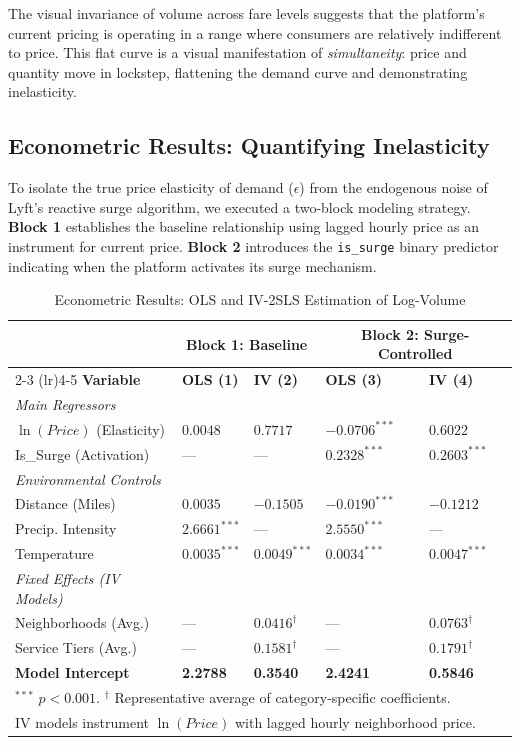 \documentclass[11pt, letterpaper]{article}
\begin{document}
The visual invariance of volume across fare levels suggests that the platform’s current pricing is operating in a range where consumers are relatively indifferent to price. This flat curve is a visual manifestation of \textit{simultaneity}: price and quantity move in lockstep, flattening the demand curve and demonstrating inelasticity.

\subsection{Econometric Results: Quantifying Inelasticity}

To isolate the true price elasticity of demand ($\epsilon$) from the endogenous noise of Lyft’s reactive surge algorithm, we executed a two-block modeling strategy. \textbf{Block 1} establishes the baseline relationship using lagged hourly price as an instrument for current price. \textbf{Block 2} introduces the \texttt{is\_surge} binary predictor indicating when the platform activates its surge mechanism.

\begin{table}[H]
\centering
\small
\caption{Econometric Results: OLS and IV-2SLS Estimation of Log-Volume}
\label{tab:elasticity_results}
\begin{tabularx}{\textwidth}{l p{1.8cm} p{1.8cm} p{1.8cm} p{1.8cm}}
\toprule
& \multicolumn{2}{c}{\textbf{Block 1: Baseline}} & \multicolumn{2}{c}{\textbf{Block 2: Surge-Controlled}} \\
\cmidrule(lr){2-3} \cmidrule(lr){4-5}
\textbf{Variable} & \textbf{OLS (1)} & \textbf{IV (2)} & \textbf{OLS (3)} & \textbf{IV (4)} \\
\midrule
\textit{Main Regressors} & & & & \\
$\ln(Price)$ (Elasticity) & $0.0048$ & $0.7717$ & $-0.0706^{***}$ & $0.6022$ \\
Is\_Surge (Activation) & --- & --- & $0.2328^{***}$ & $0.2603^{***}$ \\
\addlinespace
\textit{Environmental Controls} & & & & \\
Distance (Miles) & $0.0035$ & $-0.1505$ & $-0.0190^{***}$ & $-0.1212$ \\
Precip. Intensity & $2.6661^{***}$ & --- & $2.5550^{***}$ & --- \\
Temperature & $0.0035^{***}$ & $0.0049^{***}$ & $0.0034^{***}$ & $0.0047^{***}$ \\
\addlinespace
\textit{Fixed Effects (IV Models)} & & & & \\
Neighborhoods (Avg.) & --- & $0.0416^{\dagger}$ & --- & $0.0763^{\dagger}$ \\
Service Tiers (Avg.) & --- & $0.1581^{\dagger}$ & --- & $0.1791^{\dagger}$ \\
\midrule
\textbf{Model Intercept} & \textbf{2.2788} & \textbf{0.3540} & \textbf{2.4241} & \textbf{0.5846} \\
\bottomrule
\multicolumn{5}{l}{\footnotesize $^{***}$ $p < 0.001$. $^{\dagger}$ Representative average of category-specific coefficients.} \\
\multicolumn{5}{l}{\footnotesize IV models instrument $\ln(Price)$ with lagged hourly neighborhood price.}
\end{tabularx}
\end{table}
\end{document}
